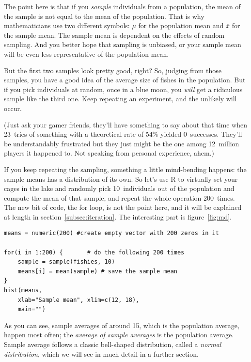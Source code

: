 \documentclass{report}
\newcommand{\code}[1]{\textsf{\ttfamily #1}}
\begin{document}
			The point here is that if you \emph{sample} individuals from a population, the mean of the sample is not equal to the mean of the population. That is why mathematicians use two different symbols: $\mu$ for the population mean and $\overline{x}$ for the sample mean. The sample mean is dependent on the effects of random sampling. And you better hope that sampling is unbiased, or your sample mean will be even less representative of the population mean.
			
			But the first two samples look pretty good, right? So, judging from those samples, you have a good idea of the average size of fishes in the population. But if you pick individuals at random, once in a blue moon, you \emph{will} get a ridiculous sample like the third one. Keep repeating an experiment, and the unlikely will occur.
			
			(Just ask your gamer friends, they'll have something to say about that time when 23~tries of something with a theoretical rate of 54\% yielded 0~successes. They'll be understandably frustrated but they just might be the one among 12~million players it happened to. Not speaking from personal experience, ahem.)
			
			If you keep repeating the sampling, something a little mind-bending happens: the sample means has a distribution of its own. So let's use R to virtually set your cages in the lake and randomly pick 10~individuals out of the population and compute the mean of that sample, and repeat the whole operation 200~times. The new bit of code, the \code{for} loop, is not the point here, and it will be explained at length in section~\ref{subsec:iteration}. The interesting part is figure~\ref{fig:md}.
			
			\begin{verbatim}
means = numeric(200) #create empty vector with 200 zeros in it

for(i in 1:200) {		# do the following 200 times
	sample = sample(fishies, 10)
	means[i] = mean(sample)	# save the sample mean
}
hist(means,
	xlab="Sample mean", xlim=c(12, 18),
	main="")
			\end{verbatim}
			
			As you can see, sample averages of around 15, which is the population average, happen most often; the \emph{average of sample averages} is the population average. Sample average follows a classic bell-shaped distribution, called a \emph{normal distribution}, which we will see in much detail in a further section.
\end{document}
